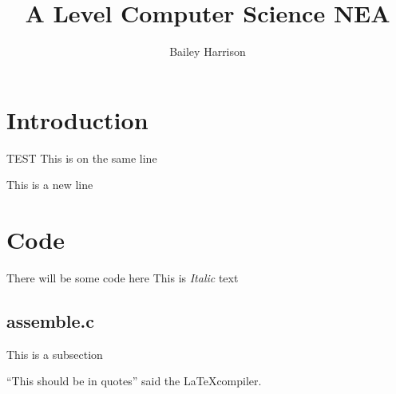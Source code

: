 \documentclass{book}
\author{Bailey Harrison}
\title{A Level Computer Science NEA}
\begin{document}
\maketitle

\section{Introduction}

TEST
This is on the same line

This is a new line

\section{Code}

There will be some code here
This is \textit{Italic} text

\subsection{assemble.c}

This is a subsection

``This should be in quotes'' said the \LaTeX compiler.
\end{document}
